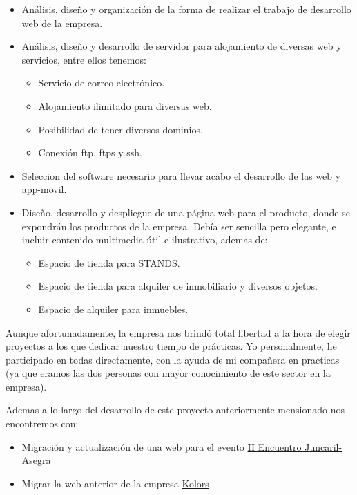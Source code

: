 		\begin{itemize}
		
			\item Análisis, diseño y organización de la forma de realizar el trabajo de desarrollo web de la empresa.
			\item Análisis, diseño y desarrollo de servidor para alojamiento de diversas web y servicios, entre ellos tenemos:
			\begin{itemize}
				\item Servicio de correo electrónico.
				\item Alojamiento ilimitado para diversas web.
				\item Posibilidad de tener diversos dominios.
				\item Conexión ftp, ftps y ssh.
				
			\end{itemize}
			\item Seleccion del software necesario para llevar acabo el desarrollo de las web y app-movil.
			\item Diseño, desarrollo y despliegue de una página web para el producto, donde se expondrán los productos de la empresa. Debía ser sencilla pero elegante, e incluir  contenido multimedia útil e ilustrativo, ademas de:
			\begin{itemize}
				\item Espacio de tienda para STANDS.
				\item Espacio de tienda para alquiler de inmobiliario y diversos objetos.
				\item Espacio de alquiler para inmuebles.
			\end{itemize}
		\end{itemize}
	
		Aunque afortunadamente, la empresa nos brindó total libertad a la hora de elegir proyectos a los que dedicar nuestro tiempo de prácticas. Yo personalmente, he participado en todas directamente, con la ayuda de mi compañera en practicas (ya que eramos las dos personas con mayor conocimiento de este sector en la empresa).\newline
		
		Ademas a lo largo del desarrollo de este proyecto anteriormente mensionado nos encontremos con:
		\begin{itemize}
			\item Migración y actualización de una web para el evento \href{http://encuentrojuncaril-asegra.com/}{II Encuentro Juncaril-Asegra}
			\item Migrar la web anterior de la empresa \href{http://www.kolors.es/}{Kolors}
		\end{itemize}
		
